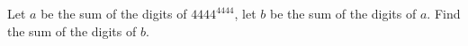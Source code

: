 Let $a$ be the sum of the digits of $4444^{4444}$, let $b$ be the sum of the digits of $a$. Find the sum of the digits of $b$.
